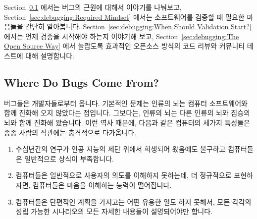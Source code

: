 Section~\ref{sec:debugging:Where Do Bugs Come From?}
에서는 버그의 근원에 대해서 이야기를 나눠보고,
Section~\ref{sec:debugging:Required Mindset}
에서는 소프트웨어를 검증할 때 필요한 마음들을 간단히 알아봅니다.
Section~\ref{sec:debugging:When Should Validation Start?}
에서는 언제 검증을 시작해야 하는지 이야기해 보고,
Section~\ref{sec:debugging:The Open Source Way} 에서 놀랍도록 효과적인 오픈소스
방식의 코드 리뷰와 커뮤니티 테스트에 대해 설명합니다.

\subsection{Where Do Bugs Come From?}
\label{sec:debugging:Where Do Bugs Come From?}

버그들은 개발자들로부터 옵니다.
기본적인 문제는 인류의 뇌는 컴퓨터 소프트웨어와 함께 진화해 오지 않았다는
점입니다.
그보다는, 인류의 뇌는 다른 인류의 뇌와 짐승의 뇌와 함께 진화해 왔습니다.
이런 역사 때문에, 다음과 같은 컴퓨터의 세가지 특성들은 종종 사람의 직관에는
충격적으로 다가옵니다.

\begin{enumerate}
\item	수십년간의 연구가 인공 지능의 제단 위에서 희생되어 왔음에도 불구하고
	컴퓨터들은 일반적으로 상식이 부족합니다.
\item	컴퓨터들은 일반적으로 사용자의 의도를 이해하지 못하는데, 더 정규적으로
	표현하자면, 컴퓨터들은 마음을 이해하는 능력이 떨어집니다.
\item	컴퓨터들은 단편적인 계획을 가지고는 어떤 유용한 일도 하지 못해서, 모든
	각각의 성립 가능한 시나리오의 모든 자세한 내용들이 설명되어야만 합니다.

\end{enumerate}

